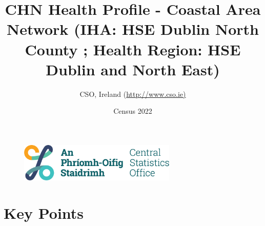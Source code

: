 \documentclass{article}
\title{CHN Health Profile - Coastal Area Network (IHA: HSE Dublin North County ;  Health Region: HSE Dublin and North East) }
\date{Census 2022}
\author{CSO, Ireland  (\url{http://www.cso.ie)}}
\begin{document}


\begin{figure}
	\centering
\includegraphics[width =75mm]{../figures/CSO_Logo.png}
\end{figure}

				 
		   
						  
														  
																																													
												 
			 
\maketitle
					
													   
				 
						 
																																																																											   
				 
				  
  \pagebreak
    	    \tableofcontents

\pagebreak


\section{Key Points}
\end{document}

